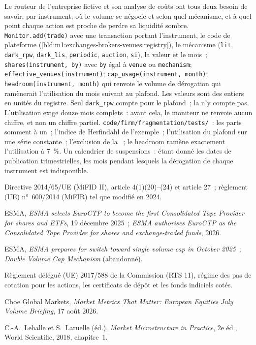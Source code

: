 \begin{build}
 Le routeur de l'entreprise fictive et son analyse de coûts ont tous deux besoin
de savoir, par instrument, où le volume se négocie et selon quel mécanisme, et à quel point
chaque action est proche de perdre sa liquidité sombre.
 \texttt{Monitor.add(trade)} avec une transaction portant
l'instrument, le code de plateforme (\cref{bld:m1:exchanges-brokers-venues:registry}),
le mécanisme (\texttt{lit}, \texttt{dark\_rpw}, \texttt{dark\_lis},
\texttt{periodic}, \texttt{auction}, \texttt{si}), la valeur et le mois~;
\texttt{shares(instrument, by)} avec \texttt{by} égal à \texttt{venue} ou
\texttt{mechanism}; \texttt{effective\_venues(instrument)};
\texttt{cap\_usage(instrument, month)}; \texttt{headroom(instrument, month)}
qui renvoie le volume de dérogation qui ramènerait l'utilisation du mois suivant au plafond.
 Les valeurs sont des entiers en unités du registre. Seul \texttt{dark\_rpw}
compte pour le plafond~; la  n'y compte pas. L'utilisation exige douze mois
complets~: avant cela, le moniteur ne renvoie aucun chiffre, et non un chiffre partiel.
 \texttt{code/firm/fragmentation/tests/}~: les parts somment à
un~; l'indice de Herfindahl de l'exemple~; l'utilisation du plafond sur une série constante~;
l'exclusion de la ~; le headroom ramène exactement l'utilisation à 7~\%.
 Un calendrier de suspensions~: étant donné les dates de publication
trimestrielles, les mois pendant lesquels la dérogation de chaque instrument est indisponible.
\end{build}

\begin{omsources}
\item Directive 2014/65/UE (MiFID II), article 4(1)(20)--(24) et article 27~;
règlement (UE) n°~600/2014 (MiFIR) tel que modifié en 2024.
\item ESMA, \emph{ESMA selects EuroCTP to become the first Consolidated Tape
Provider for shares and ETFs}, 19 décembre 2025~; \emph{ESMA authorises
EuroCTP as the Consolidated Tape Provider for shares and exchange-traded
funds}, 2026.
\item ESMA, \emph{ESMA prepares for switch toward single volume cap in October
2025}~; \emph{Double Volume Cap Mechanism} (abandonné).
\item Règlement délégué (UE) 2017/588 de la Commission (RTS 11), régime des pas de cotation
pour les actions, les certificats de dépôt et les fonds indiciels cotés.
\item Cboe Global Markets, \emph{Market Metrics That Matter: European Equities
July Volume Briefing}, 17 août 2026.
\item C.-A.~Lehalle et S.~Laruelle (éd.), \emph{Market Microstructure in
Practice}, 2e éd., World Scientific, 2018, chapitre~1.
\end{omsources}

